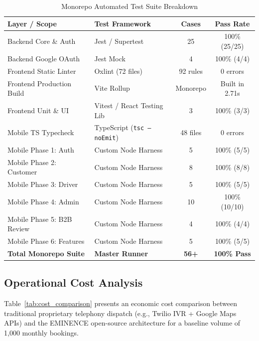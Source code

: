 \documentclass[conference]{IEEEtran}
\begin{document}
\begin{table}[htbp]
\centering
\caption{Monorepo Automated Test Suite Breakdown}
\label{tab:test_suite}
\begin{tabular}{llcc}
\toprule
\textbf{Layer / Scope} & \textbf{Test Framework} & \textbf{Cases} & \textbf{Pass Rate} \\
\midrule
Backend Core \& Auth & Jest / Supertest & 25 & 100\% (25/25) \\
Backend Google OAuth & Jest Mock & 4 & 100\% (4/4) \\
Frontend Static Linter & Oxlint (72 files) & 92 rules & 0 errors \\
Frontend Production Build & Vite Rollup & Monorepo & Built in 2.71s \\
Frontend Unit \& UI & Vitest / React Testing Lib & 3 & 100\% (3/3) \\
Mobile TS Typecheck & TypeScript (\texttt{tsc --noEmit}) & 48 files & 0 errors \\
Mobile Phase 1: Auth & Custom Node Harness & 5 & 100\% (5/5) \\
Mobile Phase 2: Customer & Custom Node Harness & 8 & 100\% (8/8) \\
Mobile Phase 3: Driver & Custom Node Harness & 5 & 100\% (5/5) \\
Mobile Phase 4: Admin & Custom Node Harness & 10 & 100\% (10/10) \\
Mobile Phase 5: B2B Review & Custom Node Harness & 4 & 100\% (4/4) \\
Mobile Phase 6: Features & Custom Node Harness & 5 & 100\% (5/5) \\
\midrule
\textbf{Total Monorepo Suite} & \textbf{Master Runner} & \textbf{56+} & \textbf{100\% Pass} \\
\bottomrule
\end{tabular}
\end{table}

\subsection{Operational Cost Analysis}
Table~\ref{tab:cost_comparison} presents an economic cost comparison between traditional proprietary telephony dispatch (e.g., Twilio IVR + Google Maps APIs) and the EMINENCE open-source architecture for a baseline volume of 1,000 monthly bookings.
\end{document}
